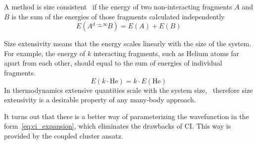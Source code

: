 A method is size consistent~\cite{pople1976theoretical} if the energy of two 
non-interacting fragments $A$ and $B$ is the sum of the energies of those 
fragments calculated independently
\begin{equation}
 E(A \overset{d \longrightarrow \infty}{-} B) = E(A) + E(B)
\end{equation}

Size extensivity means that the energy scales linearly with the size of the 
system. For example, the energy of $k$ interacting fragments, such as Helium 
atoms far apart from each other, should equal to the sum of energies of 
individual fragments.
\begin{equation}
 E(k \cdot \mathrm{He}) = k \cdot E(\mathrm{He})
\end{equation}
In thermodynamics extensive quantities scale with the system 
size,~\cite{bartlett1978many} therefore size extensivity is a desirable 
property of any many-body approach.

It turns out that there is a better way of parameterizing the wavefunction in 
the form~\ref{eq:ci_expansion}, which eliminates the drawbacks of CI. This way 
is provided by the coupled cluster ansatz.

